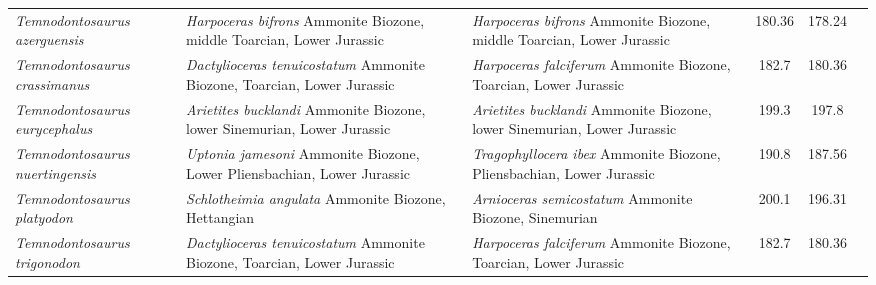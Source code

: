 \begin{longtabu}{>{\itshape}lXXSSl}
	Temnodontosaurus azerguensis                         & \emph{Harpoceras bifrons} Ammonite Biozone, middle Toarcian, Lower Jurassic                                                        & \emph{Harpoceras bifrons} Ammonite Biozone, middle Toarcian, Lower Jurassic                                                        & 180.36                   & 178.24                   & \cite{Martin2012} \\                     
	Temnodontosaurus crassimanus                         & \emph{Dactylioceras tenuicostatum} Ammonite Biozone, Toarcian, Lower Jurassic                                                      & \emph{Harpoceras falciferum} Ammonite Biozone, Toarcian, Lower Jurassic                                                            & 182.7                    & 180.36                   & \cite{Melmore1930} \\                    
	Temnodontosaurus eurycephalus                        & \emph{Arietites bucklandi} Ammonite Biozone, lower Sinemurian, Lower Jurassic                                                      & \emph{Arietites bucklandi} Ammonite Biozone, lower Sinemurian, Lower Jurassic                                                      & 199.3                    & 197.8                    & \cite{McGowan1974} \\                    
	Temnodontosaurus nuertingensis                       & \emph{Uptonia jamesoni} Ammonite Biozone, Lower Pliensbachian, Lower Jurassic                                                      & \emph{Tragophyllocera ibex} Ammonite Biozone, Pliensbachian, Lower Jurassic                                                        & 190.8                    & 187.56                   & \cite{Huene1931,Maisch1997b} \\          
	Temnodontosaurus platyodon                           & \emph{Schlotheimia angulata} Ammonite Biozone, Hettangian                                                                          & \emph{Arnioceras semicostatum} Ammonite Biozone, Sinemurian                                                                        & 200.1                    & 196.31                   & \cite{McGowan1974} \\                    
	Temnodontosaurus trigonodon                          & \emph{Dactylioceras tenuicostatum} Ammonite Biozone, Toarcian, Lower Jurassic                                                      & \emph{Harpoceras falciferum} Ammonite Biozone, Toarcian, Lower Jurassic                                                            & 182.7                    & 180.36                   & \cite{Fraas1891,Huene1922b} \\           

\end{longtabu}
